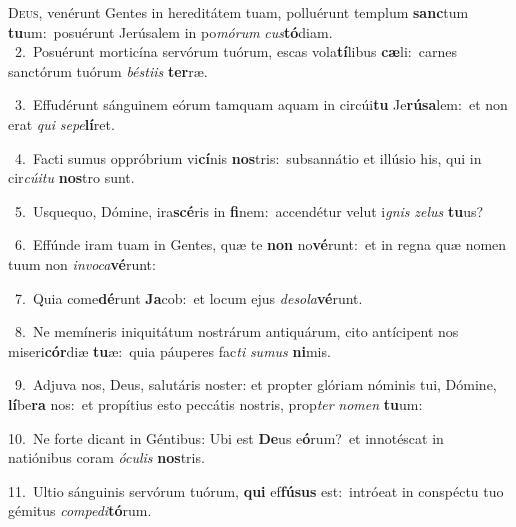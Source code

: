 \lettrine{\initial\textcolor{\initialcolor}{D}}{eus,} venérunt Gentes in hereditátem tuam, polluérunt templum \textbf{sanc}\-tum \textbf{tu}\-um:~\star posuérunt Jerúsalem in po\-\textit{mó}\-\textit{rum} \textit{cus}\-\textbf{tó}diam.\\
{\numbfont\textcolor{\numbcolor}{~2.}}~Posuérunt morticína servórum tuórum, escas vola\-\textbf{tí}\-libus \textbf{cæ}\-li:~\star carnes sanctórum tuórum \textit{bés}\-\textit{ti}\textit{is} \textbf{ter}\-ræ.\par
{\numbfont\textcolor{\numbcolor}{~3.}}~Effudérunt sánguinem eórum tamquam aquam in circúi\textbf{tu} Je\-\textbf{rú}\-\textbf{sa}lem:~\star et non erat \textit{qui} \textit{se}\-\textit{pe}\textbf{lí}ret.\par
{\numbfont\textcolor{\numbcolor}{~4.}}~Facti sumus oppróbrium vi\-\textbf{cí}\-nis \textbf{nos}\-tris:~\star subsannátio et illúsio his, qui in cir\-\textit{cú}\-\textit{i}\textit{tu} \textbf{nos}\-tro sunt.\par
{\numbfont\textcolor{\numbcolor}{~5.}}~Usquequo, Dómine, ira\-\textbf{scé}\-ris in \textbf{fi}\-nem:~\star accendétur velut i\textit{gnis} \textit{ze}\-\textit{lus} \textbf{tu}\-us?\par
{\numbfont\textcolor{\numbcolor}{~6.}}~Effúnde iram tuam in Gentes, quæ te \textbf{non} no\-\textbf{vé}\-runt:~\star et in regna quæ nomen tuum non \textit{in}\-\textit{vo}\textit{ca}\textbf{vé}runt:\par
{\numbfont\textcolor{\numbcolor}{~7.}}~Quia come\-\textbf{dé}\-runt \textbf{Ja}\-cob:~\star et locum ejus \textit{de}\-\textit{so}\textit{la}\textbf{vé}runt.\par
{\numbfont\textcolor{\numbcolor}{~8.}}~Ne memíneris iniquitátum nostrárum antiquárum, cito antícipent nos miseri\-\textbf{cór}\-diæ \textbf{tu}\-æ:~\star quia páuperes fac\textit{ti} \textit{su}\-\textit{mus} \textbf{ni}\-mis.\par
{\numbfont\textcolor{\numbcolor}{~9.}}~Adjuva nos, Deus, salutáris noster: et propter glóriam nóminis tui, Dómine, \textbf{lí}\-be\textbf{ra} nos:~\star et propítius esto peccátis nostris, prop\textit{ter} \textit{no}\-\textit{men} \textbf{tu}\-um:\par
{\numbfont\textcolor{\numbcolor}{10.}}~Ne forte dicant in Géntibus: Ubi est \textbf{De}\-us e\-\textbf{ó}\-rum?~\star et innotéscat in natiónibus coram \textit{ó}\-\textit{cu}\textit{lis} \textbf{nos}\-tris.\par
{\numbfont\textcolor{\numbcolor}{11.}}~Ultio sánguinis servórum tuórum, \textbf{qui} ef\-\textbf{fú}\-\textbf{sus} est:~\star intróeat in conspéctu tuo gémitus \textit{com}\-\textit{pe}\textit{di}\textbf{tó}rum.\par
